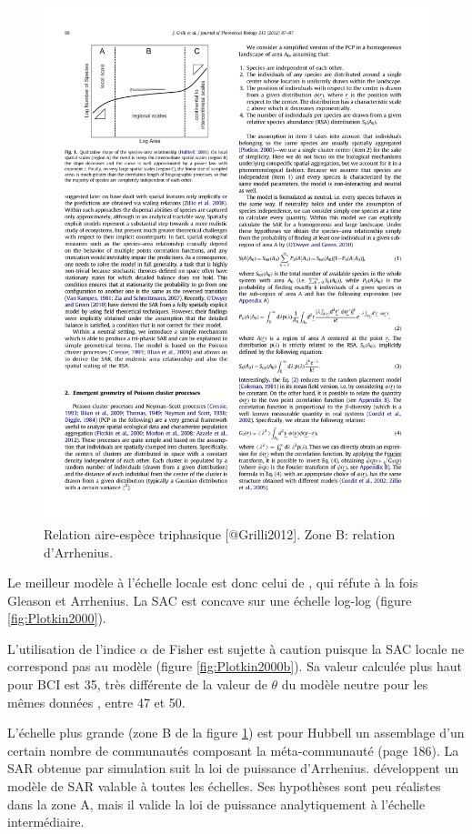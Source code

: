 \documentclass[
  11pt,
  french,
  a4paper,
  extrafontsizes,onecolumn,openright
  ]{memoir}
\begin{document}
\begin{figure}

{\centering \includegraphics[width=0.8\linewidth]{images/Grilli2012} 

}

\caption{Relation aire-espèce triphasique [@Grilli2012]. Zone B: relation d'Arrhenius.}\label{fig:Grilli2012}
\end{figure}

\normalsize

Le meilleur modèle à l'échelle locale est donc celui de \textcite{Plotkin2000}, qui réfute à la fois Gleason et Arrhenius.
La SAC est concave sur une échelle log-log (figure \ref{fig:Plotkin2000}).

L'utilisation de l'indice \(\alpha\) de Fisher est sujette à caution puisque la SAC locale ne correspond pas au modèle (figure \ref{fig:Plotkin2000b}).
Sa valeur calculée plus haut pour BCI est 35, très différente de la valeur de \(\theta\) du modèle neutre pour les mêmes données \autocite[figure 1]{Volkov2003}, entre 47 et 50.

L'échelle plus grande (zone B de la figure \ref{fig:Grilli2012}) est pour Hubbell un assemblage d'un certain nombre de communautés composant la méta-communauté (page 186).
La SAR obtenue par simulation suit la loi de puissance d'Arrhenius.
\textcite{Grilli2012} développent un modèle de SAR valable à toutes les échelles.
Ses hypothèses sont peu réalistes dans la zone A, mais il valide la loi de puissance analytiquement à l'échelle intermédiaire.
\end{document}
